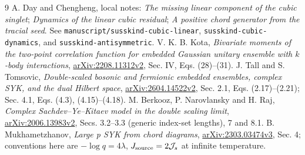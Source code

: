 \documentclass[11pt,a4paper]{article}
\newcommand{\Js}{\mathcal J_s}
\begin{document}
\begin{thebibliography}{9}
 A. Day and Chengheng, local notes:
\emph{The missing linear component of the cubic singlet};
\emph{Dynamics of the linear cubic residual};
\emph{A positive chord generator from the tracial seed}.
See \texttt{manuscript/susskind-cubic-linear},
\texttt{susskind-cubic-dynamics}, and \texttt{susskind-antisymmetric}.
 V. K. B. Kota,
\emph{Bivariate moments of the two-point correlation function for
embedded Gaussian unitary ensemble with $k$-body interactions},
\href{https://arxiv.org/html/2208.11312}{arXiv:2208.11312v2},
Sec. IV, Eqs. (28)--(31).
 J. Tall and S. Tomsovic,
\emph{Double-scaled bosonic and fermionic embedded ensembles,
complex SYK, and the dual Hilbert space},
\href{https://arxiv.org/html/2604.14522v2}{arXiv:2604.14522v2},
Sec. 2.1, Eqs. (2.17)--(2.21); Sec. 4.1,
Eqs. (4.3), (4.15)--(4.18).
 M. Berkooz, P. Narovlansky and H. Raj,
\emph{Complex Sachdev--Ye--Kitaev model in the double scaling limit},
\href{https://arxiv.org/html/2006.13983v2}{arXiv:2006.13983v2},
Secs. 3.2--3.3 (generic index-set lengths), 7 and 8.1.
 B. Mukhametzhanov,
\emph{Large p SYK from chord diagrams},
\href{https://arxiv.org/abs/2303.03474v3}{arXiv:2303.03474v3},
Sec. 4; conventions here are $-\log q=4\lambda$,
$J_{\rm source}=2\Js$ at infinite temperature.
\end{thebibliography}
\end{document}
